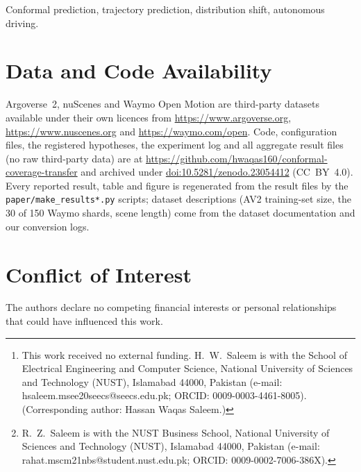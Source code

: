 \documentclass[lettersize,journal]{IEEEtran}
\begin{document}
\title{\papertitle}
\author{Hassan~Waqas~Saleem~and~Rahat~Zeeshan~Saleem%
\thanks{This work received no external funding. H.~W.~Saleem is with the School of Electrical Engineering and Computer Science,
National University of Sciences and Technology (NUST), Islamabad 44000, Pakistan (e-mail: hsaleem.msee20seecs@seecs.edu.pk;
ORCID: 0009-0003-4461-8005). (Corresponding author: Hassan Waqas Saleem.)}%
\thanks{R.~Z.~Saleem is with the NUST Business School, National University of Sciences and Technology (NUST), Islamabad 44000,
Pakistan (e-mail: rahat.mscm21nbs@student.nust.edu.pk; ORCID: 0009-0002-7006-386X).}}
\maketitle


\begin{IEEEkeywords}
Conformal prediction, trajectory prediction, distribution shift, autonomous driving.
\end{IEEEkeywords}









\section*{Data and Code Availability}
Argoverse~2, nuScenes and Waymo Open Motion are third-party datasets available under their own licences from
\url{https://www.argoverse.org}, \url{https://www.nuscenes.org} and \url{https://waymo.com/open}. Code, configuration
files, the registered hypotheses, the experiment log and all aggregate result files (no raw third-party data) are at
\url{https://github.com/hwaqas160/conformal-coverage-transfer} and archived under
\href{https://doi.org/10.5281/zenodo.23054412}{doi:10.5281/zenodo.23054412} (CC~BY~4.0). Every reported result, table and
figure is regenerated from the result files by the \texttt{paper/make\_results*.py} scripts; dataset descriptions (AV2
training-set size, the 30 of 150 Waymo shards, scene length) come from the dataset documentation and our conversion logs.

\section*{Conflict of Interest}
The authors declare no competing financial interests or personal relationships that could have influenced this work.
\end{document}
